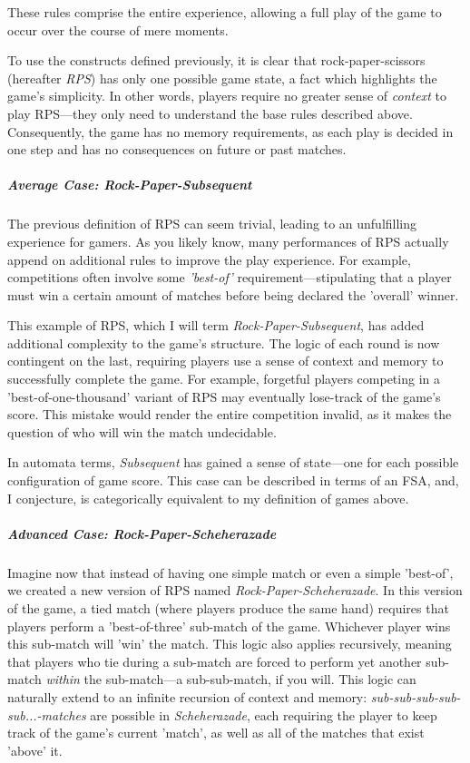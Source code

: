 \documentclass{report}
\begin{document}
These rules comprise the entire experience, allowing a full play of the game to occur over the course of mere moments.

To use the constructs defined previously, it is clear that rock-paper-scissors (hereafter \emph{RPS}) has only one possible game state, a fact which highlights the game's simplicity. In other words, players require no greater sense of \emph{context} to play RPS---they only need to understand the base rules described above. Consequently, the game has no memory requirements, as each play is decided in one step and has no consequences on future or past matches.

\subparagraph{Average Case: \emph{Rock-Paper-Subsequent}}
The previous definition of RPS can seem trivial, leading to an unfulfilling experience for gamers. As you likely know, many performances of RPS actually append on additional rules to improve the play experience. For example, competitions often involve some \emph{'best-of'} requirement---stipulating that a player must win a certain amount of matches before being declared the 'overall' winner. 

This example of RPS, which I will term \emph{Rock-Paper-Subsequent}, has added additional complexity to the game's structure. The logic of each round is now contingent on the last, requiring players use a sense of context and memory to successfully complete the game. For example, forgetful players competing in a 'best-of-one-thousand' variant of RPS may eventually lose-track of the game's score. This mistake would render the entire competition invalid, as it makes the question of who will win the match undecidable. 

In automata terms, \emph{Subsequent} has gained a sense of state---one for each possible configuration of game score. This case can be described in terms of an FSA, and, I conjecture, is categorically equivalent to my definition of games above.

\subparagraph{Advanced Case: \emph{Rock-Paper-Scheherazade}}
Imagine now that instead of having one simple match or even a simple 'best-of', we created a new version of RPS named \emph{Rock-Paper-Scheherazade}. In this version of the game, a tied match (where players produce the same hand) requires that players perform a 'best-of-three' sub-match of the game. Whichever player wins this sub-match will 'win' the match. This logic also applies recursively, meaning that players who tie during a sub-match are forced to perform yet another sub-match \emph{within} the sub-match---a sub-sub-match, if you will. This logic can naturally extend to an infinite recursion of context and memory: \emph{sub-sub-sub-sub-sub...-matches} are possible in \emph{Scheherazade}, each requiring the player to keep track of the game's current 'match', as well as all of the matches that exist 'above' it.
\end{document}
